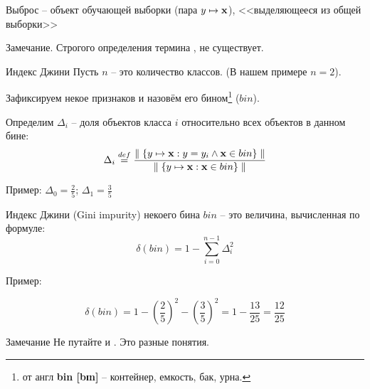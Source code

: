 \begin{frame}{Выброс}
	 -- объект обучающей выборки (пара $y \mapsto \bold x$),
	<<выделяющееся из общей выборки>>
	\begin{center}
	\begin{tikzpicture}[scale=1.5]
	
	\end{tikzpicture}
	\end{center}

	\begin{block}{Замечание.}
	Строгого определения термина , не существует.
	\end{block}
\end{frame}

\begin{frame}{Индекс Джини}
	\small
	Пусть $n$ -- это количество классов. 
	(В нашем примере $n=2$).
	
	Зафиксируем некое  признаков и назовём его 
	бином\footnote{от англ \textbf{bin [bɪn]} -- контейнер, емкость, бак, урна.}
	($bin$).
	
	Определим $\Delta_i$ -- доля объектов класса $i$ относительно всех объектов в данном бине:
	\begin{equation}
	\Delta_i \stackrel{def}{=} \frac{ \parallel \{y \mapsto \bold x : y = y_i \wedge \bold x \in bin \} \parallel}
	{
	\parallel \{y \mapsto \bold x :  \bold x \in bin \} \parallel
	}
	\end{equation}	
	\begin{center}  
	\begin{tikzpicture}[scale=1.5]
	
	\end{tikzpicture} 
	Пример:
	$\Delta_0 = \frac{2}{5}$; 
	$\Delta_1 = \frac{3}{5}$
	\end{center}

\end{frame}

\begin{frame}{Индекс Джини}
	\small
	 (Gini impurity) 
	некоего бина $bin$ -- это величина, вычисленная по формуле:
	\begin{equation}
	\delta (bin)= 1 - \sum_{i=0}^{n-1} \Delta_i ^ 2
	\end{equation}
	
	
	\begin{center}
	Пример:
	\begin{tikzpicture}[scale=1.5]
	
	\end{tikzpicture} 
	\end{center}
	
	\begin{equation*}
	\delta (bin) = 1 - \left( \frac{2}{5}\right)^2 - \left( \frac{3}{5}\right)^2 = 
	1 - \frac{13}{25} = \frac{12}{25} 
	\end{equation*}
	
	
	\begin{block}{Замечание}
	Не путайте  и 
	. Это разные понятия.
	\end{block}
\end{frame}


